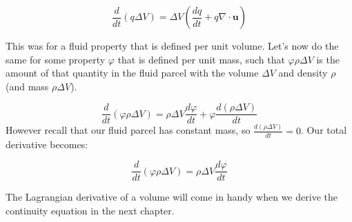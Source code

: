 \documentclass[12pt]{article}
\numberwithin{equation}{section}
\numberwithin{figure}{section}
\numberwithin{table}{section}
\begin{document}
\begin{equation}
  \frac{d}{dt} (q \Delta V) = \Delta V \left( \frac{dq}{dt} + q \nabla \cdot \mathbf{u} \right)
  \label{eq:lagrangian_property_derivative}
\end{equation}

This was for a fluid property that is defined per unit volume.
Let's now do the same for some property $\varphi$ that is defined per unit mass,
such that $\varphi \rho \Delta V$ is the amount of that quantity in the fluid
parcel with the volume $\Delta V$ and density $\rho$ (and mass $\rho \Delta V$).

\begin{equation}
  \frac{d}{dt} (\varphi \rho \Delta V) = \rho \Delta V \frac{d\varphi}{dt} + \varphi \frac{d(\rho \Delta V)}{dt}
\end{equation}
However recall that our fluid parcel has constant mass, so $\frac{d(\rho \Delta V)}{dt} = 0$.
Our total derivative becomes:

\begin{equation}
  \frac{d}{dt} (\varphi \rho \Delta V) = \rho \Delta V \frac{d\varphi}{dt}
\end{equation}

The Lagrangian derivative of a volume will come in handy when we derive the
continuity equation in the next chapter.





\end{document}
